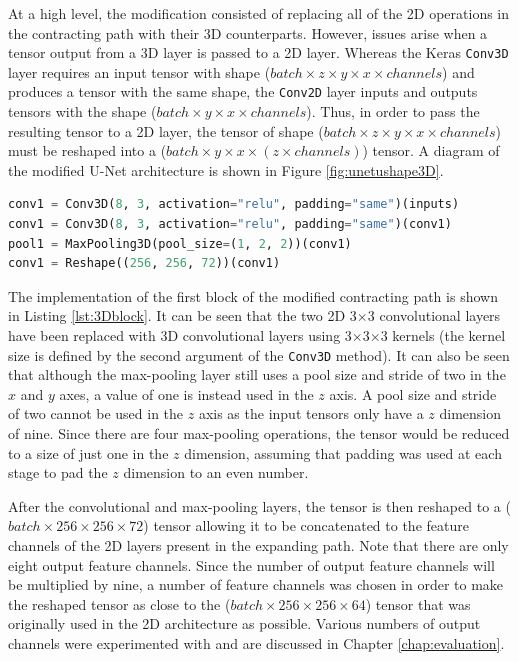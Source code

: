 At a high level, the modification consisted of replacing all of the 2D operations in the contracting path with their 3D counterparts. However, issues arise when a tensor output from a 3D layer is passed to a 2D layer. Whereas the Keras \texttt{Conv3D} layer requires an input tensor with shape ($batch \times z \times y \times x \times channels$) and produces a tensor with the same shape, the \texttt{Conv2D} layer inputs and outputs tensors with the shape ($batch \times y \times x \times channels$). Thus, in order to pass the resulting tensor to a 2D layer, the tensor of shape ($batch \times z \times y \times x \times channels$) must be reshaped into a ($batch \times y \times x \times (z \times channels)$) tensor. A diagram of the modified U-Net architecture is shown in Figure \ref{fig:unetushape3D}.

\begin{lstlisting}[float={!t},caption={The implementation of the first contracting block of the modified U-Net architecture using the Keras functional API.},label={lst:3Dblock},language=Python,upquote=true,belowskip=0pt]
conv1 = Conv3D(8, 3, activation="relu", padding="same")(inputs)
conv1 = Conv3D(8, 3, activation="relu", padding="same")(conv1)
pool1 = MaxPooling3D(pool_size=(1, 2, 2))(conv1)
conv1 = Reshape((256, 256, 72))(conv1)
\end{lstlisting}
The implementation of the first block of the modified contracting path is shown in Listing \ref{lst:3Dblock}. It can be seen that the two 2D 3$\times$3 convolutional layers have been replaced with 3D convolutional layers using 3$\times$3$\times$3 kernels (the kernel size is defined by the second argument of the \texttt{Conv3D} method). It can also be seen that although the max-pooling layer still uses a pool size and stride of two in the $x$ and $y$ axes, a value of one is instead used in the $z$ axis. A pool size and stride of two cannot be used in the $z$ axis as the input tensors only have a $z$ dimension of nine. Since there are four max-pooling operations, the tensor would be reduced to a size of just one in the $z$ dimension, assuming that padding was used at each stage to pad the $z$ dimension to an even number.

After the convolutional and max-pooling layers, the tensor is then reshaped to a ($batch \times 256 \times 256 \times 72$) tensor allowing it to be concatenated to the feature channels of the 2D layers present in the expanding path. Note that there are only eight output feature channels. Since the number of output feature channels will be multiplied by nine, a number of feature channels was chosen in order to make the reshaped tensor as close to the ($batch \times 256 \times 256 \times 64$) tensor that was originally used in the 2D architecture as possible. Various numbers of output channels were experimented with and are discussed in Chapter \ref{chap:evaluation}.

